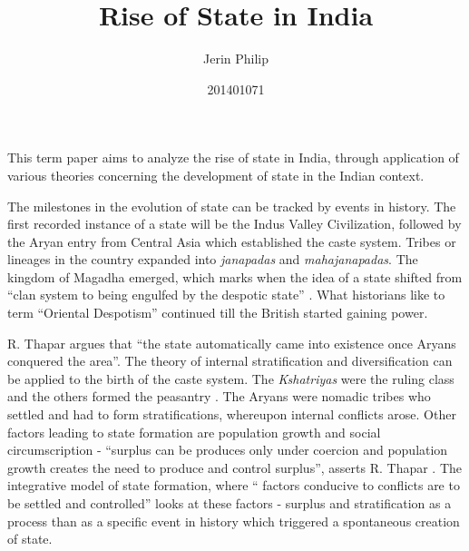 \documentclass[a4paper]{article}
\title{Rise of State in India}
\author{Jerin Philip}
\date{201401071}
\begin{document}
\maketitle
This term paper aims to analyze the rise of state in India, through
application of various theories concerning the development of state in
the Indian context. 

The milestones in the evolution of state can be tracked by events in
history.  The first recorded instance of a state will be the Indus
Valley Civilization, followed by the Aryan entry from Central Asia which
established the caste system. Tribes or lineages in the country expanded
into \textit{janapadas} and \textit{mahajanapadas}. The kingdom of
Magadha emerged, which marks when the idea of a state shifted from
``clan system to being engulfed by the despotic state'' \cite[p.
5]{thapar1984lineage}. What historians like to term ``Oriental
Despotism'' continued till the British started gaining power. 

R. Thapar argues \cite[p.4]{thapar1984lineage} that ``the state
automatically came into existence once Aryans conquered the area''. The
theory of internal stratification and diversification can be applied to
the birth of the caste system. The \textit{Kshatriyas} were the ruling
class and the others formed the peasantry \cite[p.
4]{thapar1984lineage}. The Aryans were nomadic tribes who settled and
had to form stratifications, whereupon internal conflicts arose. Other
factors leading to state formation are population growth and social
circumscription - ``surplus can be produces only under coercion and
population growth creates the need to produce and control surplus'',
asserts R. Thapar \cite[p. 8]{thapar1984lineage}. The integrative
model of state formation, where `` factors conducive to conflicts are
to be settled and controlled'' \cite[p. 8]{thapar1984lineage} looks at
these factors - surplus and stratification as a process than as a
specific event in history which triggered a spontaneous creation of
state. 
\end{document}
